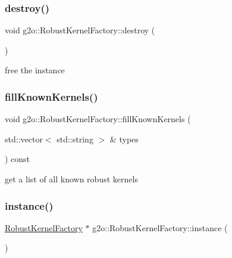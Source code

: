 \subsubsection{\texorpdfstring{destroy()}{destroy()}}
{\footnotesize\ttfamily void g2o\+::\+Robust\+Kernel\+Factory\+::destroy (\begin{DoxyParamCaption}{ }\end{DoxyParamCaption})\hspace{0.3cm}{\ttfamily [static]}}



free the instance 

\mbox{\label{classg2o_1_1_robust_kernel_factory_a078e96a0ca100165d18b146f07813765}} 
\subsubsection{\texorpdfstring{fill\+Known\+Kernels()}{fillKnownKernels()}}
{\footnotesize\ttfamily void g2o\+::\+Robust\+Kernel\+Factory\+::fill\+Known\+Kernels (\begin{DoxyParamCaption}\item[{std\+::vector$<$ std\+::string $>$ \&}]{types }\end{DoxyParamCaption}) const}

get a list of all known robust kernels \mbox{\label{classg2o_1_1_robust_kernel_factory_a9cc4361620f8d7269ad9774d3aba2fc0}} 
\subsubsection{\texorpdfstring{instance()}{instance()}}
{\footnotesize\ttfamily \mbox{\hyperlink{classg2o_1_1_robust_kernel_factory}{Robust\+Kernel\+Factory}} $\ast$ g2o\+::\+Robust\+Kernel\+Factory\+::instance (\begin{DoxyParamCaption}{ }\end{DoxyParamCaption})\hspace{0.3cm}{\ttfamily [static]}}



